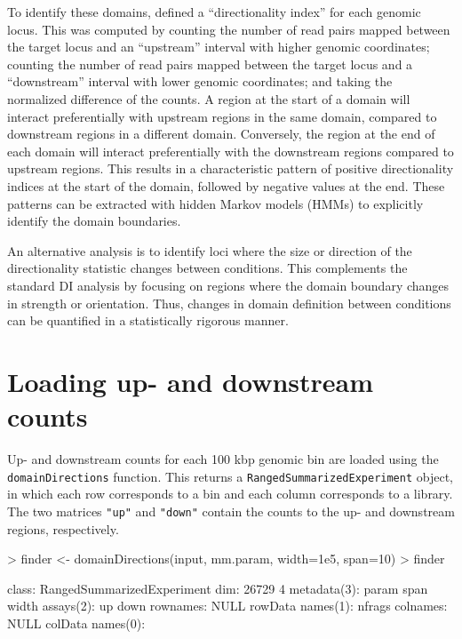 \documentclass[12pt]{report}
\renewenvironment{Schunk}{\vspace{0pt}}{\vspace{0pt}}
\newcommand{\code}[1]{{\small\texttt{#1}}}
\begin{document}
To identify these domains, \cite{dixon2012topological} defined a ``directionality index'' for each genomic locus.
This was computed by counting the number of read pairs mapped between the target locus and an ``upstream'' interval with higher genomic coordinates;
    counting the number of read pairs mapped between the target locus and a ``downstream'' interval with lower genomic coordinates;
    and taking the normalized difference of the counts.
A region at the start of a domain will interact preferentially with upstream regions in the same domain, compared to downstream regions in a different domain.
Conversely, the region at the end of each domain will interact preferentially with the downstream regions compared to upstream regions.
This results in a characteristic pattern of positive directionality indices at the start of the domain, followed by negative values at the end.
These patterns can be extracted with hidden Markov models (HMMs) to explicitly identify the domain boundaries.

An alternative analysis is to identify loci where the size or direction of the directionality statistic changes between conditions.
This complements the standard DI analysis by focusing on regions where the domain boundary changes in strength or orientation.
Thus, changes in domain definition between conditions can be quantified in a statistically rigorous manner.

\section{Loading up- and downstream counts}
Up- and downstream counts for each 100 kbp genomic bin are loaded using the \code{domainDirections} function.
This returns a \code{RangedSummarizedExperiment} object, in which each row corresponds to a bin and each column corresponds to a library.
The two matrices \code{"up"} and \code{"down"} contain the counts to the up- and downstream regions, respectively.

\begin{Schunk}
\begin{Sinput}
> finder <- domainDirections(input, mm.param, width=1e5, span=10)
> finder
\end{Sinput}
\begin{Soutput}
class: RangedSummarizedExperiment 
dim: 26729 4 
metadata(3): param span width
assays(2): up down
rownames: NULL
rowData names(1): nfrags
colnames: NULL
colData names(0):
\end{Soutput}
\end{Schunk}
\end{document}
